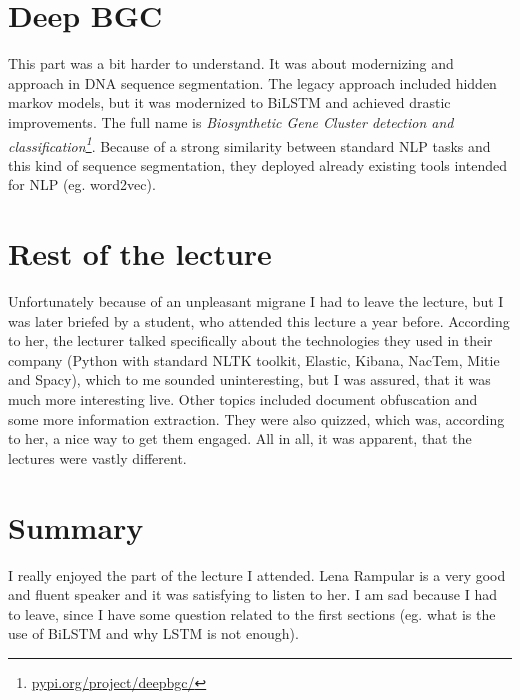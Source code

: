 \documentclass[a4paper]{article}
\begin{document}
\section*{Deep BGC}

This part was a bit harder to understand. It was about modernizing and approach in DNA sequence segmentation. The legacy approach included hidden markov models, but it was modernized to BiLSTM and achieved drastic improvements. The full name is \textit{Biosynthetic Gene Cluster detection and classification\footnote{\href{https://pypi.org/project/deepbgc/}{pypi.org/project/deepbgc/}}}. Because of a strong similarity between standard NLP tasks and this kind of sequence segmentation, they deployed already existing tools intended for NLP (eg. word2vec).

\pagebreak

\section*{Rest of the lecture}

Unfortunately because of an unpleasant migrane I had to leave the lecture, but I was later briefed by a student, who attended this lecture a year before. According to her, the lecturer talked specifically about the technologies they used in their company (Python with standard NLTK toolkit, Elastic, Kibana, NacTem, Mitie and Spacy), which to me sounded uninteresting, but I was assured, that it was much more interesting live. Other topics included document obfuscation and some more information extraction. They were also quizzed, which was, according to her, a nice way to get them engaged. All in all, it was apparent, that the lectures were vastly different.

\section*{Summary}

I really enjoyed the part of the lecture I attended. Lena Rampular is a very good and fluent speaker and it was satisfying to listen to her. I am sad because I had to leave, since I have some question related to the first sections (eg. what is the use of BiLSTM and why LSTM is not enough).
\end{document}
